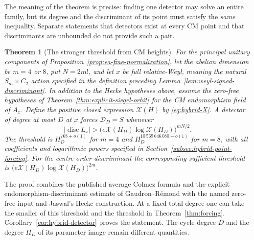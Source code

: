 \documentclass[11pt]{article}
\newtheorem{theorem}{Theorem}[section]
\theoremstyle{definition}
\theoremstyle{remark}
\begin{document}
The meaning of the theorem is precise: finding one detector may
solve an entire family, but its degree and the discriminant of its
point must satisfy the \emph{same} inequality. Separate statements
that detectors exist at every CM point and that discriminants are
unbounded do not provide such a pair.

\begin{theorem}[The stronger threshold from CM heights]
\label{thm:sharper-forcing-intro}
For the principal unitary components of
Proposition~\ref{prop:ea-fine-normalization}, let the abelian
dimension be $m=4$ or $8$, put $N=2m!$, and let $x$ be full
relative-Weyl, meaning the natural $S_m\times C_2$ action specified
in the definition preceding Lemma~\ref{lem:weyl-signed-discriminant}. In addition to the Hecke hypotheses above, assume
the zero-free hypotheses of Theorem~\ref{thm:explicit-siegel-orbit}
for the CM endomorphism field of $A_x$.
Define the positive closed expression $\mathcal X(H)$ by
\eqref{eq:hybrid-X}. A detector of degree at most $D$ at $x$ forces
$\mathcal D_D=S$ whenever
\[
 |\operatorname{disc}L_x|>
 \bigl(e\mathcal X(H_D)\log\mathcal X(H_D)\bigr)^{mN/2}.
\]
The threshold is $H_D^{768+o(1)}$ for $m=4$ and
$H_D^{10\,569\,646\,080+o(1)}$ for $m=8$, with all coefficients
and logarithmic powers specified in Section~\ref{subsec:hybrid-point-forcing}.
For the centre-order discriminant the corresponding sufficient
threshold is
$\bigl(e\mathcal X(H_D)\log\mathcal X(H_D)\bigr)^{2m}$.
\end{theorem}

The proof combines the published average Colmez formula and the
explicit endomorphism-discriminant estimate of Gaudron--R\'emond
with the named zero-free input and Jaswal's Hecke construction.
At a fixed total degree one can take the smaller of this threshold
and the threshold in Theorem~\ref{thm:forcing}.
Corollary~\ref{cor:hybrid-detector} proves the statement. The cycle
degree $D$ and the degree $H_D$ of its parameter image remain
different quantities.
\end{document}
